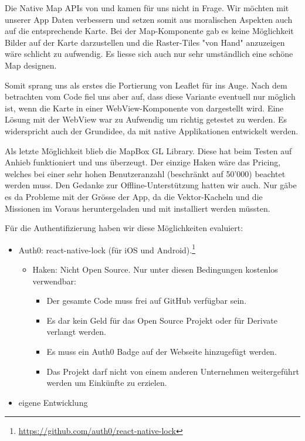 Die Native Map APIs von  und  kamen für uns nicht in Frage.
Wir möchten mit unserer App  Daten verbessern und setzen somit aus moralischen Aspekten auch auf die entsprechende Karte.
Bei der  Map-Komponente gab es keine Möglichkeit Bilder auf der Karte darzustellen und die Raster-Tiles "von Hand" anzuzeigen wäre schlicht zu aufwendig. 
Es liesse sich auch nur sehr umständlich eine schöne Map designen.

Somit sprang uns als erstes die Portierung von Leaflet für  ins Auge. 
Nach dem betrachten vom Code fiel uns aber auf, dass diese Variante eventuell nur möglich ist, wenn die Karte in einer WebView-Komponente von  dargestellt wird.
Eine Lösung mit der WebView war zu Aufwendig um richtig getestet zu werden. 
Es widerspricht auch der Grundidee, da mit  native Applikationen entwickelt werden.

Als letzte Möglichkeit blieb die MapBox GL Library.
Diese hat beim Testen auf Anhieb funktioniert und uns überzeugt.
Der einzige Haken wäre das Pricing, welches bei einer sehr hohen Benutzeranzahl (beschränkt auf 50'000) beachtet werden muss.
Den Gedanke zur Offline-Unterstützung hatten wir auch.
Nur gäbe es da Probleme mit der Grösse der App, da die Vektor-Kacheln und die Missionen im Voraus heruntergeladen und mit installiert werden müssten.


Für die Authentifizierung haben wir diese Möglichkeiten evaluiert:

\begin{itemize}
	\item Auth0: react-native-lock (für iOS und Android).\footnote{\url{https://github.com/auth0/react-native-lock}}
	\begin{itemize}
    	\item Haken: Nicht Open Source. Nur unter diesen Bedingungen kostenlos verwendbar:
    	\begin{itemize}
    		\item Der gesamte Code muss frei auf GitHub verfügbar sein.
    		\item Es dar kein Geld für das Open Source Projekt oder für Derivate verlangt werden. 
    		\item Es muss ein Auth0 Badge auf der Webseite hinzugefügt werden.
    		\item Das Projekt darf nicht von einem anderen Unternehmen weitergeführt werden um Einkünfte zu erzielen.
		\end{itemize} 
	\end{itemize} 
	\item eigene Entwicklung
\end{itemize}

